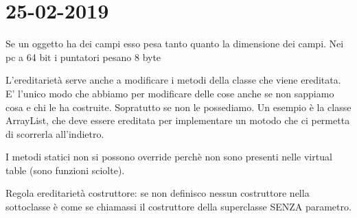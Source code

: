 

\newpage
\section{25-02-2019}
\par

Se un oggetto ha dei campi esso pesa tanto quanto la dimensione dei campi. \newline
Nei pc a 64 bit i puntatori pesano 8 byte \newline

L'ereditarietà serve anche a modificare i metodi della classe che viene ereditata. E' l'unico modo che abbiamo per modificare delle cose anche se non sappiamo cosa e chi le ha costruite. Sopratutto se non le possediamo. Un esempio è la classe ArrayList, che deve essere ereditata per implementare un motodo che ci permetta di scorrerla all'indietro. \newline


I metodi statici non si possono override perchè non sono presenti nelle virtual table (sono funzioni sciolte). \newline

Regola ereditarietà costruttore: se non definisco nessun costruttore nella sottoclasse è come se chiamassi il costruttore della superclasse SENZA parametro. 






